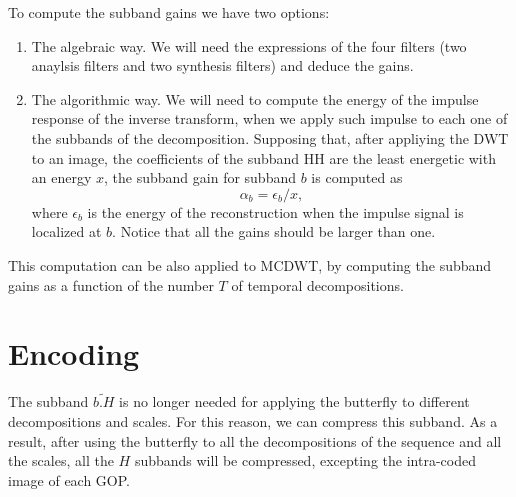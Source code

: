 To compute the subband gains we have two options:
\begin{enumerate}
\item The algebraic way. We will need the expressions of the four
  filters (two anaylsis filters and two synthesis filters) and deduce
  the gains.
\item The algorithmic way. We will need to compute the energy of the
  impulse response of the inverse transform, when we apply such
  impulse to each one of the subbands of the decomposition. Supposing
  that, after appliying the DWT to an image, the coefficients of the
  subband HH are the least energetic with an energy $x$, the subband
  gain for subband $b$ is computed as
  \begin{equation}
    \alpha_b = \epsilon_b/x,
  \end{equation}
  where $\epsilon_b$ is the energy of the reconstruction when the
  impulse signal is localized at $b$. Notice that all the gains should
  be larger than one.
\end{enumerate}

This computation can be also applied to MCDWT, by computing the subband
gains as a function of the number $T$ of temporal decompositions.

\section{Encoding}
The subband $\tilde{b.H}$ is no longer needed for applying the
butterfly to different decompositions and scales. For this reason, we
can compress this subband. As a result, after using the butterfly to
all the decompositions of the sequence and all the scales, all the $H$
subbands will be compressed, excepting the intra-coded image of each
GOP.

